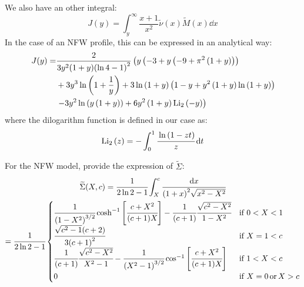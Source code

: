 %
We also have an other integral:
%
\begin{equation}
    J(y)=\int_y^{\infty}\frac{x+1}{x^2}\widetilde{\nu}{(x)}\widetilde{M}{(x)}\dd{x}
\end{equation}
%
In the case of an NFW profile, this can be expressed in an analytical way:
%
\begin{align*}
    J(y)=&
        \frac{2}{3{y^2}(1+y){\left(\ln{4}-1\right)}^2}
        \left(y\left(-3+y\left(-9+\pi^2\left(1+y\right)\right)\right)\right.\\
    &+3{y^3}\ln\left(1+\frac{1}{y}\right)+3\ln\left(1+y\right)
            \left(1-y+y^2\left(1+y\right)\ln\left(1+y\right)\right)\\
    &\left.-3{y^2}\ln\left({y}\left(1+y\right)\right)+6{y^2}
        \left(1+y\right){\mathrm{Li}_2\left(-y\right)}\right)\\
\end{align*}
%
where the dilogarithm function is defined in our case as:
%
\begin{equation}
    \mathrm{Li}_2\left(z\right)=-\int_0^1\cfrac{\ln{(1-zt)}}{z}\,{\rm{d}}{t}
\end{equation}

For the NFW model, \citet{MBM+10} provide the expression of
$\widetilde{\Sigma}$:
%
\begin{multline}
    \widetilde{\Sigma}(X,c)=\cfrac{1}{2\ln2-1}\int_X^c\cfrac{{\rm{d}}{x}}{{(1+x)}^2\sqrt{x^2-X^2}}\\
    =\cfrac{1}{2\ln2-1}\begin{cases}
        \cfrac{1}{{(1-X^2)}^{3/2}}
        \cosh^{-1}\left[\cfrac{c+X^2}{(c+1)X}\right]-
        \cfrac{1}{(c+1)}\cfrac{\sqrt{c^2-X^2}}{1-X^2} &\text{if } 0<X<1 \\
    \cfrac{\sqrt{c^2-1}(c+2)}{3{(c+1)}^2} &\text{if } X=1<c\\
    \cfrac{1}{(c+1)}\cfrac{\sqrt{c^2-X^2}}{X^2-1}-
    \cfrac{1}{{(X^2-1)}^{3/2}}
    \cos^{-1}\left[\cfrac{c+X^2}{(c+1)X}\right] &\text{if } 1<X<c\\
    0 &\text{if } X=0\,\text{or}\,X>c
    \end{cases}
\end{multline}

